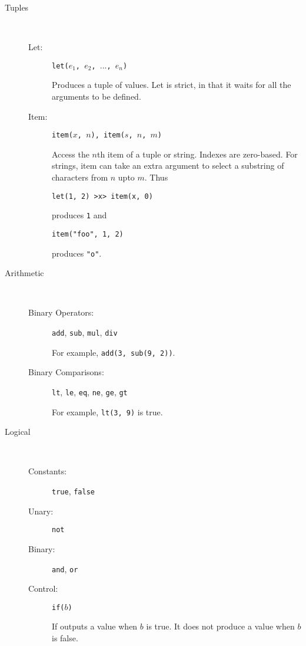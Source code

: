 \documentclass{article}
\begin{document}
\begin{description}
\item[Tuples]\  
\begin{description}

\item[Let:]
{\tt let($e_1$, $e_2$, $...$, $e_n$)}

Produces a tuple of values. Let is strict, in that it waits for
all the arguments to be defined.

\item[Item:]
{\tt item($x$, $n$), item($s$, $n$, $m$)}

Access the $n$th item of a tuple or string. Indexes are zero-based.
For strings, item can take an extra argument to select a substring 
of characters from $n$ upto $m$. Thus 

{\tt let(1, 2) >x> item(x, 0)} 

produces {\tt 1} and 

{\tt item("foo", 1, 2)} 

produces {\tt "o"}.

\end{description}

\item[Arithmetic]\  
\begin{description}
\item[Binary Operators:]
	{\tt add}, 
	{\tt sub}, 
	{\tt mul}, 
	{\tt div}

For example, {\tt add(3, sub(9, 2))}.

\item[Binary Comparisons:]
{\tt lt}, 
{\tt le}, 
{\tt eq}, 
{\tt ne}, 
{\tt ge}, 
{\tt gt} 

For example, {\tt lt(3, 9)} is true.

\end{description}

\item[Logical]\ 
\begin{description}
\item[Constants:]
{\tt true},
{\tt false}

\item[Unary:]
{\tt not}

\item[Binary:]
{\tt and},
{\tt or}

\item[Control:]
{\tt if($b$)}

If outputs a value when $b$ is true. It does not produce a value
when $b$ is false. 
\end{description}


\end{description}
\end{document}
